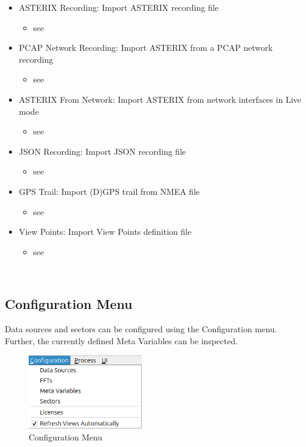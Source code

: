 \begin{itemize}
 \item ASTERIX Recording: Import ASTERIX recording file
 \begin{itemize}
 \item see 
 \end{itemize}
 \item PCAP Network Recording: Import ASTERIX from a PCAP network recording
  \begin{itemize}
 \item see 
 \end{itemize}
 \item ASTERIX From Network: Import ASTERIX from network interfaces in Live mode
  \begin{itemize}
 \item see 
 \end{itemize}
 \item JSON Recording: Import JSON recording file
  \begin{itemize}
 \item see 
 \end{itemize}
 \item GPS Trail: Import (D)GPS trail from NMEA file
  \begin{itemize}
 \item see 
 \end{itemize}
 \item View Points: Import View Points definition file
  \begin{itemize}
 \item see 
 \end{itemize}
\end{itemize}
\  \\

\subsection{Configuration Menu}
\label{sec:ui_overview_config_menu}

Data sources and sectors can be configured using the Configuration menu. Further, the currently defined Meta Variables can be inspected.

\begin{figure}[H]
  \center
    \includegraphics[width=5cm,frame]{figures/ui_configuration_menu.png}
  \caption{Configuration Menu}
\end{figure}

